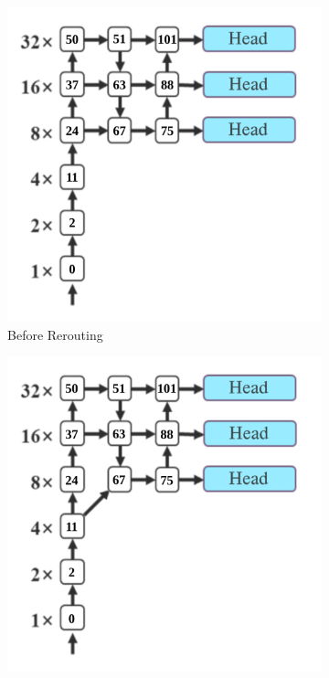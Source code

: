 \begin{figure}
    \centering
    \begin{subfigure}[][][b]{0.4\textwidth}
      \includegraphics[width=1\linewidth]{figures/deeperconn-before.png}
      \caption{Before Rerouting}
      \label{fig:deeperconn-before}
    \end{subfigure}\hfill%
    \begin{subfigure}[][][t]{0.4\textwidth}
      \includegraphics[width=1\linewidth]{figures/deeperconn-after.png}

\end{subfigure}
\end{figure}
